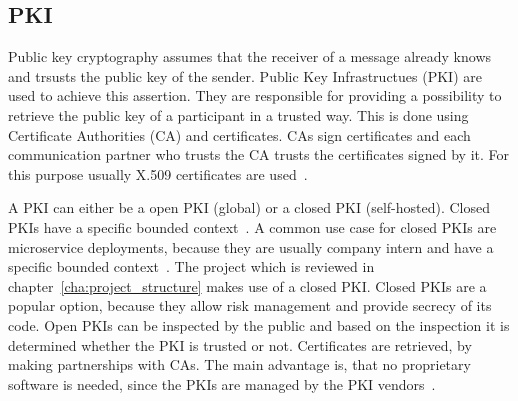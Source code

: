\subsection{PKI}
Public key cryptography assumes that the receiver of a message already knows and trsusts the public key of the sender.
Public Key Infrastructues (PKI) are used to achieve this assertion.
They are responsible for providing a possibility to retrieve the public key of a participant in a trusted way.
This is done using Certificate Authorities (CA) and certificates.
CAs sign certificates and each communication partner who trusts the CA trusts the certificates signed by it.
For this purpose usually X.509 certificates are used~\cite{anderson2020security}.

A PKI can either be a open PKI (global) or a closed PKI (self-hosted).
Closed PKIs have a specific bounded context~\cite{hlavaty2003risk}.
A common use case for closed PKIs are microservice deployments, because they are usually company intern and have a specific bounded context~\cite{dias2020microservices}.
The project which is reviewed in chapter~\ref{cha:project_structure} makes use of a closed PKI.
Closed PKIs are a popular option, because they allow risk management and provide secrecy of its code.
Open PKIs can be inspected by the public and based on the inspection it is determined whether the PKI is trusted or not.
Certificates are retrieved, by making partnerships with CAs.
The main advantage is, that no proprietary software is needed, since the PKIs are managed by the PKI vendors~\cite{hlavaty2003risk}.

